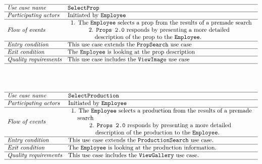 \documentclass[12pt]{article}
\begin{document}
\[
\begin{array}{ll}
\hline
\textit{Use case name} & \texttt{SelectProp} \\
\hline
\textit{Participating actors} & \text{Initiated by \texttt{Employee}} \\
\hline
\textit{Flow of events} & 
\begin{array}{l}
\text{1. The \texttt{Employee} selects a prop from the results of a premade search} \\
\quad \quad \quad \text{2. \texttt{Props 2.0} responds by presenting a more detailed}\\ \quad \quad \quad \quad \text{description of the prop to the \texttt{Employee}.}
\end{array} \\
\hline
\textit{Entry condition} & \text{This use case extends the  \texttt{PropSearch} use case} \\
\hline
\textit{Exit condition} & \text{The \texttt{Employee} is looking at the prop description} \\
\hline
\textit{Quality requirements} & \text{This use case includes the \texttt{ViewImage} use case} \\
\hline
\end{array}
\]
\\\\
\[
\begin{array}{ll}
\hline
\textit{Use case name} & \texttt{SelectProduction} \\
\hline
\textit{Participating actors} & \text{Initiated by \texttt{Employee}} \\
\hline
\textit{Flow of events} & 
\begin{array}{l}
\text{1. The \texttt{Employee} selects a production from the results of a premade}\\ \quad \text{search}\\
\quad \quad \quad \text{2. \texttt{Props 2.0} responds by presenting a more detailed}\\
\quad \quad \quad \quad \text{description of the production to the \texttt{Employee}.}
\end{array} \\
\hline
\textit{Entry condition} &
\text{This use case extends the \texttt{ProductionSearch} use case.}\\
\hline
\textit{Exit condition} & \text{The \texttt{Employee} is looking at the production information.} \\
\hline
\textit{Quality requirements} & \text{This use case includes the \texttt{ViewGallery} use case.} \\
\hline
\end{array}
\]
\end{document}
